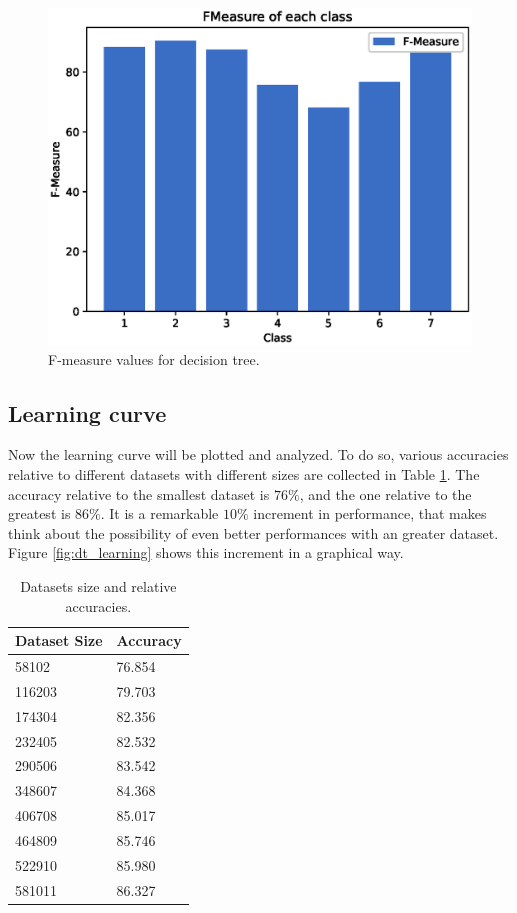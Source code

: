 \documentclass[a4paper, 10pt]{article}
\begin{document}
\begin{figure}[H]
 \centering
 \includegraphics[width=0.8\linewidth]{pictures/decision_tree_fmeasure.eps}
 \caption{F-measure values for decision tree.}
 \label{fig:dt_fmeasure}
\end{figure}

 \subsection{Learning curve}
Now the learning curve will be plotted and analyzed. To do so, various accuracies relative to different datasets with different sizes are collected in Table \ref{tab:dt_learning}. The accuracy relative to the smallest dataset is $76\%$, and the one relative to the greatest is $86\%$. It is a remarkable $10\%$ increment in performance, that makes think about the possibility of even better performances with an greater dataset. Figure \ref{fig:dt_learning} shows this increment in a graphical way.
\begin{table}[H]
\centering
\begin{tabular}{|l|l|}
\hline
\textbf{Dataset Size} & \textbf{Accuracy}\\\hline
58102 & 76.854\\\hline
116203 & 79.703\\\hline
174304 & 82.356\\\hline
232405 & 82.532\\\hline
290506 & 83.542\\\hline
348607 & 84.368\\\hline
406708 & 85.017\\\hline
464809 & 85.746\\\hline
522910 & 85.980\\\hline
581011 & 86.327\\\hline
\end{tabular}
\caption{Datasets size and relative accuracies.}
\label{tab:dt_learning}
\end{table}
\end{document}
